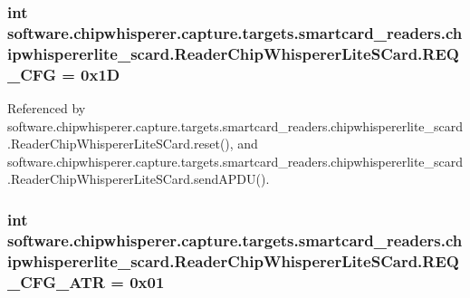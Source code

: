 \subsubsection[{R\+E\+Q\+\_\+\+C\+F\+G}]{\setlength{\rightskip}{0pt plus 5cm}int software.\+chipwhisperer.\+capture.\+targets.\+smartcard\+\_\+readers.\+chipwhispererlite\+\_\+scard.\+Reader\+Chip\+Whisperer\+Lite\+S\+Card.\+R\+E\+Q\+\_\+\+C\+F\+G = 0x1\+D\hspace{0.3cm}{\ttfamily [static]}}\label{classsoftware_1_1chipwhisperer_1_1capture_1_1targets_1_1smartcard__readers_1_1chipwhispererlite_fcbff8031d4c94f40f5e5a51a3e4a7d0_a3b61366548fa6b130e59bbf27e4d616c}


Referenced by software.\+chipwhisperer.\+capture.\+targets.\+smartcard\+\_\+readers.\+chipwhispererlite\+\_\+scard.\+Reader\+Chip\+Whisperer\+Lite\+S\+Card.\+reset(), and software.\+chipwhisperer.\+capture.\+targets.\+smartcard\+\_\+readers.\+chipwhispererlite\+\_\+scard.\+Reader\+Chip\+Whisperer\+Lite\+S\+Card.\+send\+A\+P\+D\+U().

\hypertarget{classsoftware_1_1chipwhisperer_1_1capture_1_1targets_1_1smartcard__readers_1_1chipwhispererlite_fcbff8031d4c94f40f5e5a51a3e4a7d0_aff4ef613eac58d5f53e0225e656d8035}{}
\subsubsection[{R\+E\+Q\+\_\+\+C\+F\+G\+\_\+\+A\+T\+R}]{\setlength{\rightskip}{0pt plus 5cm}int software.\+chipwhisperer.\+capture.\+targets.\+smartcard\+\_\+readers.\+chipwhispererlite\+\_\+scard.\+Reader\+Chip\+Whisperer\+Lite\+S\+Card.\+R\+E\+Q\+\_\+\+C\+F\+G\+\_\+\+A\+T\+R = 0x01\hspace{0.3cm}{\ttfamily [static]}}\label{classsoftware_1_1chipwhisperer_1_1capture_1_1targets_1_1smartcard__readers_1_1chipwhispererlite_fcbff8031d4c94f40f5e5a51a3e4a7d0_aff4ef613eac58d5f53e0225e656d8035}



